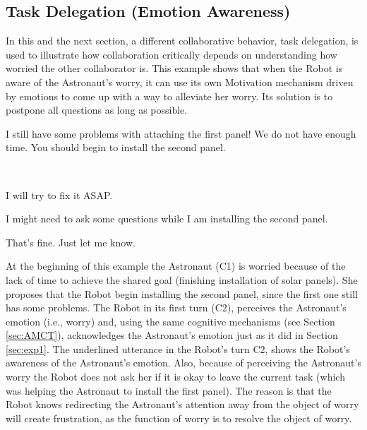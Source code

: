 \subsection{Task Delegation (Emotion Awareness)}
\label{sec:exp3}

In this and the next section, a different collaborative behavior, task
delegation, is used to illustrate how collaboration critically depends on
understanding how worried the other collaborator is. This example shows that
when the Robot is aware of the Astronaut's worry, it can use its own Motivation
mechanism driven by emotions to come up with a way to alleviate her worry. Its
solution is to postpone all questions as long as possible. 

\begin{description}
  \item \textit{\textbf{\fontsize{9pt}{12pt}\selectfont{C1. Astronaut:}}} I
  still have some problems with attaching the first panel! We do not have enough
  time. You should begin to install the second panel.\\

  \item {}\\

  \item \textit{\textbf{\fontsize{9pt}{12pt}\selectfont{C3. Astronaut:}}} I will
  try to fix it ASAP.\\

  \item \textit{\textbf{\fontsize{9pt}{12pt}\selectfont{C4. Robot:}}} I might
  need to ask some questions while I am installing the second panel.\\

  \item \textit{\textbf{\fontsize{9pt}{12pt}\selectfont{C5. Astronaut:}}} That's
  fine. Just let me know.
  
\end{description}

At the beginning of this example the Astronaut (C1) is worried because of the
lack of time to achieve the shared goal (finishing installation of solar
panels). She proposes that the Robot begin installing the second panel, since
the first one still has some problems. The Robot in its first turn (C2),
perceives the Astronaut's emotion (i.e., worry) and, using the same cognitive
mechanisms (see Section \ref{sec:AMCT}), acknowledges the Astronaut's emotion
just as it did in Section \ref{sec:exp1}. The underlined utterance in the
Robot's turn C2, shows the Robot's awareness of the Astronaut's emotion. Also,
because of perceiving the Astronaut's worry the Robot does not ask her if it is
okay to leave the current task (which was helping the Astronaut to install the
first panel). The reason is that the Robot knows redirecting the Astronaut's
attention away from the object of worry will create frustration, as the function
of worry is to resolve the object of worry.

